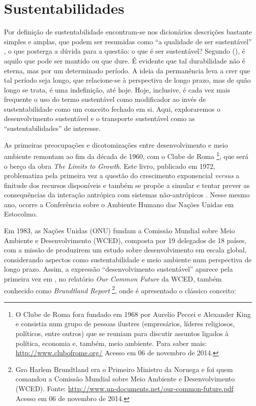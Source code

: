 \clearpage
\section{Sustentabilidades}

Por definição de sustentabilidade encontram-se nos dicionários descrições bastante simples e amplas, que podem ser resumidas como ``a qualidade de ser sustentável'' \cite{MICHAELIS2014}, o que posterga a dúvida para a questão: o que é ser sustentável? Segundo  (\citeyear{BLACK2010}), é aquilo que pode ser mantido ou que dure. É evidente que tal durabilidade não é eterna, mas por um determinado período. A ideia da permanência leva a crer que tal período seja longo, que relacione-se à perspectiva de longo prazo, mas de quão longo se trata, é uma indefinição, até hoje. Hoje, inclusive, é cada vez mais frequente o uso do termo sustentável como modificador ao invés de sustentabilidade como um conceito fechado em si. Aqui, exploraremos o desenvolvimento  sustentável e o transporte sustentável como as ``sustentabilidades'' de interesse.

As primeiras preocupações e dicotomizações entre desenvolvimento e meio ambiente remontam ao fim da década de 1960, com o Clube de Roma%
\footnote{O Clube de Roma fora fundado em 1968 por Aurelio Peccei e Alexander King e consistia num grupo de pessoas ilustres (empresários, líderes religiosos, políticos, entre outros) que se reuniam para discutir assuntos ligados à política, economia e, também, meio ambiente. Para saber mais: \url{http://www.clubofrome.org/} Acesso em 06 de novembro de 2014.}, que será o berço da obra \emph{The Limits to Growth}. Este livro, publicado em 1972, problematiza pela primeira vez a questão do crescimento exponencial \emph{versus} a finitude dos recursos disponíveis e também se propõe a simular e tentar prever as consequências da interação antrópica com sistemas não-antrópicos \cite{MEADOWS1972}. Nesse mesmo ano, ocorre a Conferência sobre o Ambiente Humano das Nações Unidas em Estocolmo.

Em 1983, as Nações Unidas (ONU) fundam a Comissão Mundial sobre Meio Ambiente e Desenvolvimento (WCED), composta por 19 delegados de 18 países, com a missão de produzirem um estudo sobre desenvolvimento em escala global, considerando aspectos como sustentabilidade e meio ambiente num perspectiva de longo prazo. Assim, a expressão ``desenvolvimento sustentável'' aparece pela primeira vez em \citeyear{WCED1987}, no relatório \emph{Our Common Future} da WCED, também conhecido como \emph{Brundtland Report}%
\footnote{Gro Harlem Brundtland era o Primeiro Ministro da Noruega e foi quem comandou a Comissão Mundial sobre Meio Ambiente e Desenvolvimento (WCED). Fonte: \url{http://www.un-documents.net/our-common-future.pdf} Acesso em 06 de novembro de 2014.}, onde é apresentado o clássico conceito:

